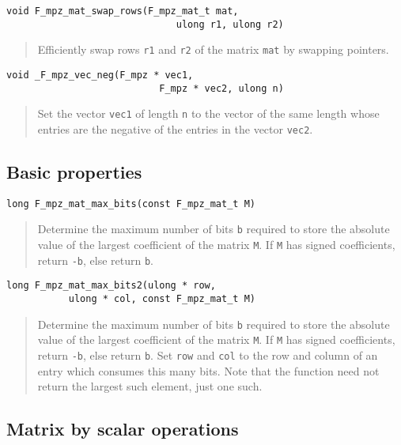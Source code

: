 \documentclass[a4paper,10pt]{article}
\newcommand{\code}{\lstinline}
\begin{document}
\begin{lstlisting}
void F_mpz_mat_swap_rows(F_mpz_mat_t mat, 
                              ulong r1, ulong r2)
\end{lstlisting}
\begin{quote}
Efficiently swap rows \code{r1} and \code{r2} of the matrix \code{mat} by swapping pointers.
\end{quote}

\begin{lstlisting}
void _F_mpz_vec_neg(F_mpz * vec1, 
                           F_mpz * vec2, ulong n)
\end{lstlisting}
\begin{quote}
Set the vector \code{vec1} of length \code{n} to the vector of the same length whose entries are the negative
of the entries in the vector \code{vec2}.
\end{quote}

\subsection{Basic properties}

\begin{lstlisting}
long F_mpz_mat_max_bits(const F_mpz_mat_t M)
\end{lstlisting}
\begin{quote}
Determine the maximum number of bits \code{b} required to store the absolute value of the largest 
coefficient of the matrix \code{M}. If \code{M} has signed coefficients, return \code{-b}, else return 
\code{b}.
\end{quote}

\begin{lstlisting}
long F_mpz_mat_max_bits2(ulong * row, 
           ulong * col, const F_mpz_mat_t M)
\end{lstlisting}
\begin{quote}
Determine the maximum number of bits \code{b} required to store the absolute value of the largest 
coefficient of the matrix \code{M}. If \code{M} has signed coefficients, return \code{-b}, else return 
\code{b}. Set \code{row} and \code{col} to the row and column of an entry which consumes this many bits.
Note that the function need not return the largest such element, just one such.
\end{quote}

\subsection{Matrix by scalar operations}
\end{document}
